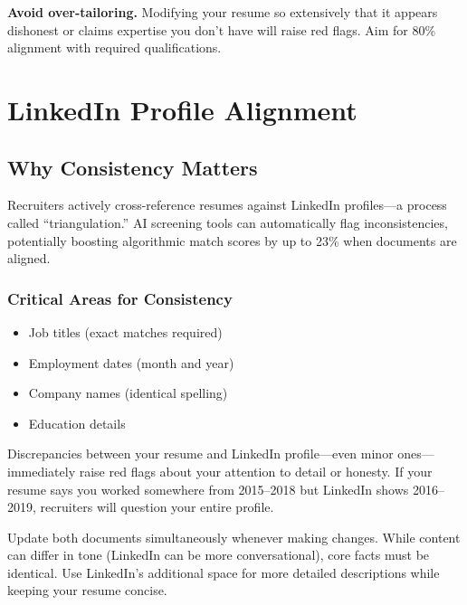\documentclass[11pt,a4paper]{article}
\begin{document}
\begin{warning}
\textbf{Avoid over-tailoring.} Modifying your resume so extensively that it appears dishonest or claims expertise you don't have will raise red flags. Aim for 80\% alignment with required qualifications.
\end{warning}

\section{LinkedIn Profile Alignment}

\subsection{Why Consistency Matters}

\begin{keystat}
Recruiters actively cross-reference resumes against LinkedIn profiles---a process called ``triangulation.'' AI screening tools can automatically flag inconsistencies, potentially boosting algorithmic match scores by up to 23\% when documents are aligned.
\end{keystat}

\subsubsection{Critical Areas for Consistency}

\begin{itemize}
    \item Job titles (exact matches required)
    \item Employment dates (month and year)
    \item Company names (identical spelling)
    \item Education details
\end{itemize}

\begin{warning}
Discrepancies between your resume and LinkedIn profile---even minor ones---immediately raise red flags about your attention to detail or honesty. If your resume says you worked somewhere from 2015--2018 but LinkedIn shows 2016--2019, recruiters will question your entire profile.
\end{warning}

\begin{bestpractice}
Update both documents simultaneously whenever making changes. While content can differ in tone (LinkedIn can be more conversational), core facts must be identical. Use LinkedIn's additional space for more detailed descriptions while keeping your resume concise.
\end{bestpractice}
\end{document}

